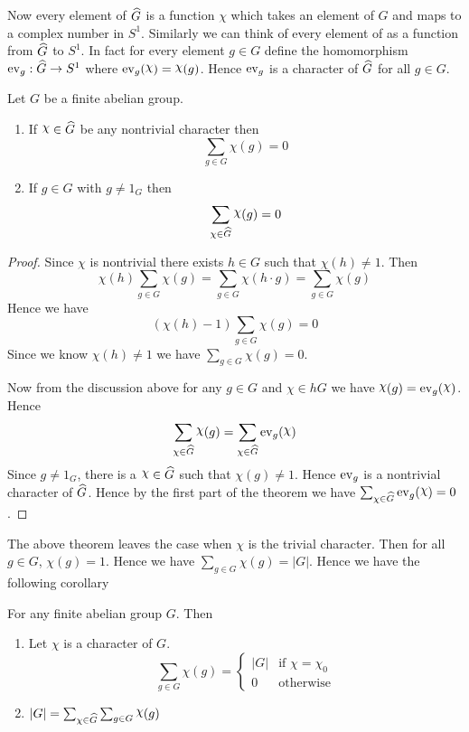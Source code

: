 Now every element of $\widehat{G}$ is a function $\chi$ which takes an element of $G$ and maps to a complex number in $S^1$. Similarly we can think of every element of as a function from $\widehat{G}$ to $S^1$. In fact for every element $g\in G$ define the homomorphism $\operatorname{ev}_g:\widehat{G}\to S^1$ where $\ev_g(\chi)=\chi(g)$. Hence $\operatorname{ev}_g$ is a character of $\widehat{G}$ for all $g\in G$.
\begin{Theorem}{}{}
  Let $G$ be a finite abelian group.   \begin{enumerate}[label=(\roman*)]
    \item If $\chi\in \hG$ be any nontrivial character then \begin{equation}
            \sum_{g\in G}\chi(g)=0
          \end{equation}
    \item If $g\in G$ with $g\neq 1_G$ then \begin{equation}
            \sum_{\oldchi\in \hG}\chi(g)=0
          \end{equation}
  \end{enumerate}
\end{Theorem}
\begin{proof}
  Since $\chi$ is nontrivial there exists $h\in G$ such that $\chi(h)\neq 1$. Then $$\chi(h)\sum_{g\in G}\chi(g)=\sum_{g\in G}\chi(h\cdot g)= \sum_{g\in G}\chi(g)$$Hence we have $$(\chi(h)-1)\sum_{g\in G}\chi(g)=0$$Since we know $\chi(h)\neq 1$ we have $\sum_{g\in G}\chi(g)=0$.

  Now from the discussion above for any $g\in G$ and $\chi\in hG$ we have $\chi(g)=\ev_g(\chi)$. Hence $$\sum_{\oldchi\in \hG}\chi(g)=\sum_{\oldchi\in \hG}\ev_g(\chi)$$Since $g\neq 1_G$, there is a $\chi\in\hG$ such that $\chi(g)\neq 1$. Hence $\operatorname{ev}_g$ is a nontrivial character of $\widehat{G}$. Hence by the first part of the theorem we have $\sum_{\oldchi\in \hG}\ev_g(\chi)=0$.
\end{proof}

The above theorem leaves the case when $\chi$ is the trivial character. Then for all $g\in G$, $\chi(g)=1$. Hence we have $\sum_{g\in G}\chi(g)=|G|$. Hence we have the following corollary
\begin{observation}\label{obs:char-sum}
  For any finite abelian group $G$. Then \begin{enumerate}[label=(\roman*)]
    \item Let $\chi$ is a character of $G$. \begin{equation}\label{eq:char-sum}
            \sum_{g\in G}\chi(g)=\begin{cases}
              |G| & \text{if $\chi=\chi_0$} \\
              0   & \text{otherwise}
            \end{cases}
          \end{equation}
    \item $|G|=\sum_{\oldchi\in \hG}\sum_{g\in G}\chi(g)$
  \end{enumerate}
\end{observation}

